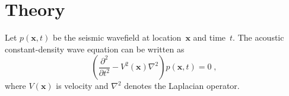 \section{Theory}
Let $p(\mathbf{x},t)$ be the seismic wavefield at location~$\mathbf{x}$ and time~$t$. The acoustic constant-density wave equation can be written as
\begin{equation}
  \label{eq:weq1}
\left( \frac{\partial^2}{\partial t^2} - V^2 (\mathbf{x}) \nabla^2 \right) p(\mathbf{x},t)=0\;,
\end{equation}
where $V(\mathbf{x})$ is velocity and $\nabla^2$ denotes the Laplacian operator.

